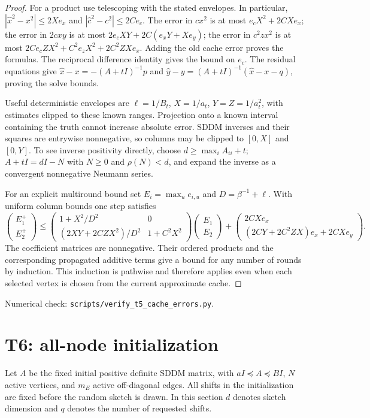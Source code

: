 \documentclass[11pt]{article}
\newcommand{\E}{\mathbb E}
\begin{document}
\begin{proof}
For a product use telescoping with the stated envelopes. In particular,
$|\widehat x^2-x^2|\leq2Xe_x$ and
$|\widehat c^2-c^2|\leq2Ce_c$.
The error in $cx^2$ is at most $e_cX^2+2CXe_x$;
the error in $2cxy$ is at most $2e_cXY+2C(e_xY+Xe_y)$;
the error in $c^2zx^2$ is at most
$2Ce_cZX^2+C^2e_zX^2+2C^2ZXe_x$.
Adding the old cache error proves the formulas.
The reciprocal difference identity gives the bound on $e_c$.
The residual equations give
$\widehat x-x=-(A+tI)^{-1}p$ and
$\widehat y-y=(A+tI)^{-1}(\widehat x-x-q)$, proving the solve bounds.

Useful deterministic envelopes are $\ell=1/B_t$, $X=1/a_t$,
$Y=Z=1/a_t^2$, with estimates clipped to these known ranges.
Projection onto a known interval containing the truth cannot increase
absolute error. SDDM inverses and their squares are entrywise
nonnegative, so columns may be clipped to $[0,X]$ and $[0,Y]$.
To see inverse positivity directly, choose $d\geq\max_i A_{ii}+t$;
$A+tI=dI-N$ with $N\geq0$ and $\rho(N)<d$, and expand the inverse
as a convergent nonnegative Neumann series.

For an explicit multiround bound set $E_i=\max_u e_{i,u}$ and
$D=\beta^{-1}+\ell$. With uniform column bounds one step satisfies
\[
 \begin{pmatrix}E_1^+\\E_2^+\end{pmatrix}
 \leq
 \begin{pmatrix}
 1+X^2/D^2&0\\
 (2XY+2CZX^2)/D^2&1+C^2X^2
 \end{pmatrix}
 \begin{pmatrix}E_1\\E_2\end{pmatrix}
 +\begin{pmatrix}
 2CXe_x\\(2CY+2C^2ZX)e_x+2CXe_y
 \end{pmatrix}.
\]
The coefficient matrices are nonnegative. Their ordered products and
the corresponding propagated additive terms give a bound for any
number of rounds by induction. This induction is pathwise and
therefore applies even when each selected vertex is chosen from
the current approximate cache.
\end{proof}
\noindent Numerical check: \texttt{scripts/verify\_t5\_cache\_errors.py}.

\section{T6: all-node initialization}
Let $A$ be the fixed initial positive definite SDDM matrix, with
$aI\preceq A\preceq BI$, $N$ active vertices, and $m_E$ active
off-diagonal edges. All shifts in the initialization are fixed before
the random sketch is drawn. In this section $d$ denotes sketch
dimension and $q$ denotes the number of requested shifts.
\end{document}
